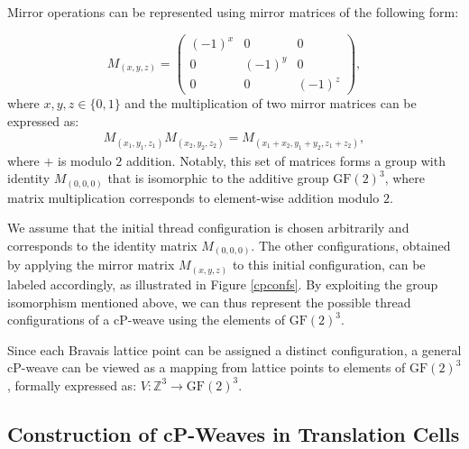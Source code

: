 \documentclass[unnumsec,webpdf,contemporary,large]{oup-authoring-template}%
\theoremstyle{thmstyleone}%
\theoremstyle{thmstyletwo}%
\theoremstyle{thmstylethree}%
\newcommand{\GF}{{\mathrm{GF}}}
\newcommand{\NC}[1]{{\color{black} #1}}
\newcommand{\ergun}[1]{{\color{black} #1}}
\begin{document}
\ergun{
Mirror operations can be represented using mirror matrices of the following form:

\begin{equation} 
\label{Eq:MirrorMatrix}
M_{(x,y,z)} =
\begin{pmatrix}
(-1)^x & 0 & 0\\
0 & (-1)^y & 0\\
0 & 0 & (-1)^z
\end{pmatrix},
\end{equation}
where $x, y, z \in \{0, 1\}$
and the multiplication of two mirror matrices can be expressed as:
\begin{align} 
\label{Eq:MatrixInverse}
M_{(x_1,y_1,z_1)} M_{(x_2,y_2,z_2)} =
M_{(x_1+x_2, y_1+y_2, z_1+z_2)},
\end{align}
where $+$ is modulo $2$ addition. %
\NC{Notably, this set of matrices forms a group with identity $M_{(0,0,0)}$ that is isomorphic to the additive group $\GF(2)^3$, where matrix multiplication corresponds to element-wise addition modulo $2$.}

We assume that the initial thread configuration is chosen arbitrarily and corresponds to the identity matrix $M_{(0,0,0)}$. The other configurations, obtained by applying the mirror matrix $M_{(x,y,z)}$ to this initial configuration, can be labeled accordingly, as illustrated in Figure \ref{cpconfs}. By exploiting
the group isomorphism mentioned above, we can thus represent the possible thread configurations of a cP-weave using the elements of $\GF(2)^3$.   


Since each Bravais lattice point can be assigned a distinct configuration, a general cP-weave can be viewed as a mapping from lattice points to elements of $\GF(2)^3$, formally expressed as:
$V: \mathbb{Z}^3 \to \GF(2)^3.$ 
}

\subsection{Construction of cP-Weaves in Translation Cells}
\end{document}
